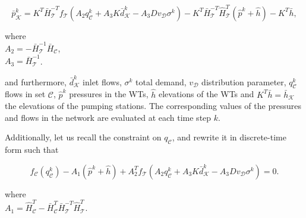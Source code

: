 \begin{equation}
  \label{recall_output_eq}
  \bar{p}^{k}_{\mathcal{K}} = K^T \bar{H}^{-T}_{\mathcal{T}}f_{\mathcal{T}}(A_2 q^{k}_{\mathcal{C}} + A_3 K \bar{d}^{k}_{\mathcal{K}} - A_3 D v_{\mathcal{D}} \sigma^{k}) - K^T\bar{H}^{-T}_{\mathcal{T}}\hat{H}^{T}_{\mathcal{T}} (\hat{p}^{k} + \hat{h}) - K^T\bar{h} ,
\end{equation} 

\vspace{-1mm}

\begin{minipage}[t]{0.4\textwidth}
where\\
\hspace*{8mm} $A_2 = -\bar{H}^{-1}_{\mathcal{T}} \bar{H}_{\mathcal{C}} $, \vspace*{1.5mm}\\
\hspace*{8mm} $A_3 = \bar{H}^{-1}_{\mathcal{T}}$.
\end{minipage}

and furthermore, $\bar{d}^{k}_{\mathcal{K}}$ inlet flows, $\sigma^{k}$ total demand, $v_{\mathcal{D}}$ distribution parameter, $q^{k}_{\mathcal{C}}$ flows in set $\mathcal{C}$, $\hat{p}^{k}$ pressures in the WTs, $\hat{h}$ elevations of the WTs and $K^T\bar{h} = \bar{h}_{\mathcal{K}} $ the elevations of the pumping stations. The corresponding values of the pressures and flows in the network are evaluated at each time step $k$. 

Additionally, let us recall the constraint on $q_\mathcal{C}$, and rewrite it in discrete-time form such that

 \begin{equation}
\label{recall_constraint eq}
f_{\mathcal{C}}(q^{k}_{\mathcal{C}}) - A_1(\hat{p}^{k} + \hat{h}) + A_2^T f_{\mathcal{T}}(A_2 q^{k}_{\mathcal{C}} + A_3 K \bar{d}^{k}_{\mathcal{K}} - A_3 D v_{\mathcal{D}} \sigma^{k}) = 0.
\end{equation} 

\vspace{-1mm}

\begin{minipage}[t]{0.4\textwidth}
where\\
\hspace*{8mm} $A_1 = \hat{H}^T_{\mathcal{C}} -\bar{H}^T_{\mathcal{C}}\bar{H}^{-T}_{\mathcal{T}}\hat{H}^T_{\mathcal{T}}$. 
\end{minipage}

